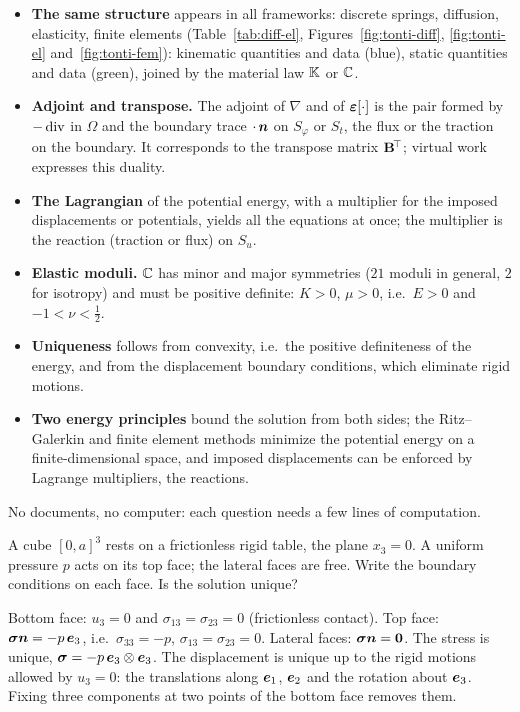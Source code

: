 \begin{gbox*}
\begin{itemize}
  \item \textbf{The same structure} appears in all frameworks: discrete
  springs, diffusion, elasticity, finite elements (Table~\ref{tab:diff-el},
  Figures~\ref{fig:tonti-diff}, \ref{fig:tonti-el} and~\ref{fig:tonti-fem}):
  kinematic quantities and data (blue), static quantities and data (green),
  joined by the material law $\mathbb{K}$ or $\mathbb{C}$.
  \item \textbf{Adjoint and transpose.} The adjoint of $\nabla$ and of
  $\bm{\varepsilon}[\cdot]$ is the pair formed by $-\operatorname{div}$ in $\Omega$ and the boundary
  trace $\cdot\,\bm{n}$ on $S_\varphi$ or $S_t$, the flux or the traction on the
  boundary. It corresponds to the transpose matrix $\mathbf{B}^{\!\top}$; virtual work
  expresses this duality.
  \item \textbf{The Lagrangian} of the potential energy, with a multiplier
  for the imposed displacements or potentials, yields all the equations at
  once; the multiplier is the reaction (traction or flux) on $S_u$.
  \item \textbf{Elastic moduli.} $\mathbb{C}$ has minor and major symmetries
  ($21$ moduli in general, $2$ for isotropy) and must be positive definite:
  $K>0$, $\mu>0$, i.e.\ $E>0$ and $-1<\nu<\tfrac12$.
  \item \textbf{Uniqueness} follows from convexity, i.e.\ the positive
  definiteness of the energy, and from the displacement boundary conditions,
  which eliminate rigid motions.
  \item \textbf{Two energy principles} bound the solution from both sides;
  the Ritz--Galerkin and finite element methods minimize the potential energy
  on a finite-dimensional space, and imposed displacements can be enforced by
  Lagrange multipliers, the reactions.
\end{itemize}
\end{gbox*}

\label{sec:el-exo}

No documents, no computer: each question needs a few lines of computation.

\label{exo:q-bc}
%
A cube $[0,a]^3$ rests on a frictionless rigid table, the plane $x_3=0$. A
uniform pressure $p$ acts on its top face; the lateral faces are free. Write
the boundary conditions on each face. Is the solution unique?
\begin{solution}
Bottom face: $u_3=0$ and $\sigma_{13}=\sigma_{23}=0$ (frictionless contact). Top
face: $\bm{\sigma}\bm{n}=-p\,\bm{e}_3$, i.e.\ $\sigma_{33}=-p$, $\sigma_{13}=\sigma_{23}=0$.
Lateral faces: $\bm{\sigma}\bm{n}=\bm{0}$. The stress is unique,
$\bm{\sigma}=-p\,\bm{e}_3\otimes\bm{e}_3$. The displacement is unique up to the rigid
motions allowed by $u_3=0$: the translations along $\bm{e}_1$, $\bm{e}_2$ and the
rotation about $\bm{e}_3$. Fixing three components at two points of the bottom
face removes them.
\end{solution}

